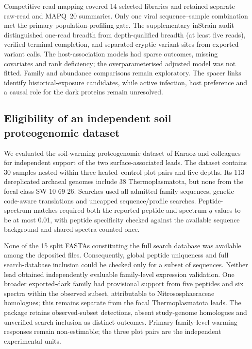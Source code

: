 Competitive read mapping covered 14 selected libraries and retained separate raw-read and MAPQ~20 summaries. Only one viral sequence--sample combination met the primary population-profiling gate. The supplementary inStrain audit distinguished one-read breadth from depth-qualified breadth (at least five reads), verified terminal completion, and separated cryptic variant sites from exported variant calls. The host-association models had sparse outcomes, missing covariates and rank deficiency; the overparameterised adjusted model was not fitted. Family and abundance comparisons remain exploratory. The spacer links identify historical-exposure candidates, while active infection, host preference and a causal role for the dark proteins remain unresolved.

\subsection*{Eligibility of an independent soil proteogenomic dataset}

We evaluated the soil-warming proteogenomic dataset of Karaoz and colleagues \citep{karaoz2026proteogenomics} for independent support of the two surface-associated leads. The dataset contains 30 samples nested within three heated--control plot pairs and five depths. Its 113 dereplicated archaeal genomes include 38 Thermoplasmatota, but none from the focal class SW-10-69-26. Searches used all admitted family sequences, genetic-code-aware translations and uncapped sequence/profile searches. Peptide-spectrum matches required both the reported peptide and spectrum $q$-values to be at most 0.01, with peptide specificity checked against the available sequence background and shared spectra counted once.

None of the 15 split FASTAs constituting the full search database was available among the deposited files. Consequently, global peptide uniqueness and full search-database inclusion could be checked only for a subset of sequences. Neither lead obtained independently evaluable family-level expression validation. One broader exported-dark family had provisional support from five peptides and six spectra within the observed subset, attributable to Nitrososphaeraceae homologues; this remains separate from the focal Thermoplasmatota leads. The package retains observed-subset detections, absent study-genome homologues and unverified search inclusion as distinct outcomes. Primary family-level warming responses remain non-estimable; the three plot pairs are the independent experimental units.

